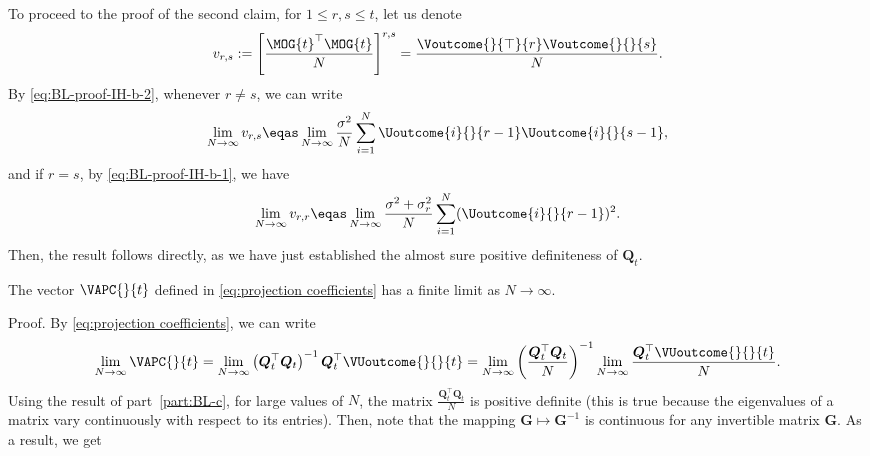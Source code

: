 \begin{enumerate}[label=(\alph*)]
        To proceed to the proof of the second claim, for $1\leq r,s \leq t$, let us denote
        \begin{align*}
            v_{r,s}
            :=
            \left[
            \frac{\MOG{t}^\top \MOG{t}}{N} 
            \right]^{r,s}
            =
            \frac{\Voutcome{}{\top}{r} \Voutcome{}{}{s}}{N}. 
        \end{align*}
        By \eqref{eq:BL-proof-IH-b-2}, whenever $r\neq s$, we can write
        \begin{align*}
            \lim_{N \rightarrow \infty}
            v_{r,s}
            \eqas
            \lim_{N \rightarrow \infty}
            \frac{\sigma^2}{N} \sum_{i=1}^N \Uoutcome{i}{}{r-1}\Uoutcome{i}{}{s-1},
        \end{align*}
        and if $r=s$, by \eqref{eq:BL-proof-IH-b-1}, we have
        \begin{align*}
            \lim_{N \rightarrow \infty}
            v_{r,r}
            \eqas
            \lim_{N \rightarrow \infty}
            \frac{\sigma^2+\sigma_r^2}{N} \sum_{i=1}^N (\Uoutcome{i}{}{r-1})^2.
        \end{align*}
        Then, the result follows directly, as we have just established the almost sure positive definiteness of $\bm{Q}_t$.
        \begin{corollary}
            \label{cl:alpha is bounded}
            The vector $\VAPC{}{t}$ defined in \eqref{eq:projection coefficients} has a finite limit as $N \rightarrow \infty$.
        \end{corollary}
        Proof. By \eqref{eq:projection coefficients}, we can write
        \begin{align}
            \label{eq:cl-alpha is finite}
            \lim_{N \rightarrow \infty} \VAPC{}{t}
            =
            \lim_{N \rightarrow \infty} \left(
            \bm{Q}_t^\top \bm{Q}_t
            \right)^{-1}
            \bm{Q}_t^\top \VUoutcome{}{}{t}
            =
            \lim_{N \rightarrow \infty} \left(
            \frac{\bm{Q}_t^\top \bm{Q}_t}{N}
            \right)^{-1}
            \lim_{N \rightarrow \infty}
            \frac{\bm{Q}_t^\top \VUoutcome{}{}{t}}{N}.
        \end{align}    
        Using the result of part~\ref{part:BL-c}, for large values of $N$, the matrix $\frac{\bm{Q}_t^\top \bm{Q}_t}{N}$ is positive definite (this is true because the eigenvalues of a matrix vary continuously with respect to its entries). Then, note that the mapping $\bm{G} \mapsto \bm{G}^{-1}$ is continuous for any invertible matrix $\bm{G}$. As a result, we get

\end{enumerate}
